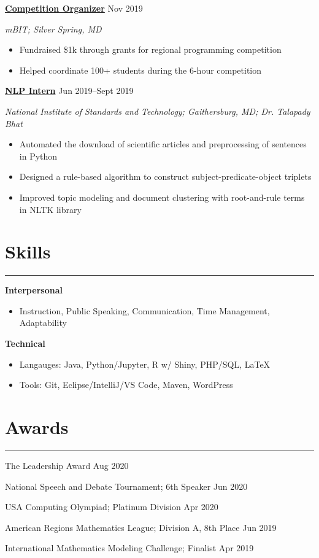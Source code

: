 \documentclass[11pt]{article}
\newcommand{\resumesection}[1]{\vspace{-0.3cm}\section*{\color{highlight}#1}\vspace{-0.3cm}\hrule\vspace{0.3cm}}
\begin{document}
\textbf{\href{https://mbit.mbhs.edu/}{Competition Organizer}} \hfill Nov 2019 \par
\textit{mBIT; Silver Spring, MD}
\begin{itemize}
	\item Fundraised \$1k through grants for regional programming competition
	\item Helped coordinate 100+ students during the 6-hour competition
\end{itemize}\vspace{0.1cm}

\textbf{\href{https://github.com/petezh/Root-and-Rule-NLP}{NLP Intern}} \hfill Jun 2019--Sept 2019\par
\textit{National Institute of Standards and Technology; Gaithersburg, MD; Dr. Talapady Bhat}
\begin{itemize}
	\item Automated the download of scientific articles and preprocessing of sentences in Python
	\item Designed a rule-based algorithm to construct subject-predicate-object triplets
	\item Improved topic modeling and document clustering with root-and-rule terms in NLTK library
\end{itemize}\vspace{0.1cm}


\resumesection{Skills}

\textbf{Interpersonal}
\begin{itemize} 
	\item Instruction, Public Speaking, Communication, Time Management, Adaptability
\end{itemize}\vspace{0.1cm}

\textbf{Technical}
\begin{itemize} 
	\item Langauges: Java, Python/Jupyter, R w/ Shiny, PHP/SQL, \LaTeX
	\item Tools: Git, Eclipse/IntelliJ/VS Code, Maven, WordPress
\end{itemize}\vspace{0.1cm}

\resumesection{Awards}

The Leadership Award \hfill Aug 2020 \par
National Speech and Debate Tournament; 6th Speaker \hfill Jun 2020 \par
USA Computing Olympiad; Platinum Division \hfill Apr 2020 \par
American Regions Mathematics League; Division A, 8th Place \hfill Jun 2019 \par
International Mathematics Modeling Challenge; Finalist \hfill Apr 2019\par
\end{document}

